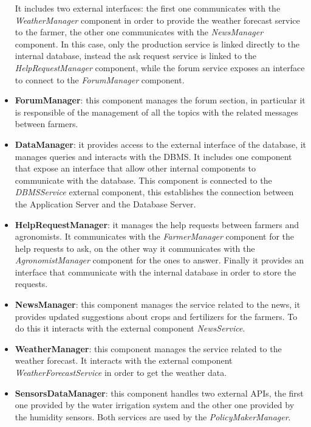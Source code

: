 \documentclass[table, 12pt]{article}
\begin{document}
\begin{itemize}
    It includes two external interfaces: the first one communicates with the \textit{WeatherManager} component in order to provide the weather forecast service to the farmer, the other one communicates with the \textit{NewsManager} component.
    In this case, only the production service is linked directly to the internal database, instead the ask request service is linked to the \textit{HelpRequestManager} component, while the forum service exposes an interface to connect to the \textit{ForumManager} component.
    \item \textbf{ForumManager}: this component manages the forum section, in particular it is responsible of the management of all the topics with the related messages between farmers.
    \item \textbf{DataManager}: it provides access to the external interface of the database, it manages queries and interacts with the DBMS.
    It includes one component that expose an interface that allow other internal components to communicate with the database.
    This component is connected to the \textit{DBMSService} external component, this establishes the connection between the Application Server and the Database Server.
    \item \textbf{HelpRequestManager}: it manages the help requests between farmers and agronomists.
    It communicates with the \textit{FarmerManager} component for the help requests to ask, on the other way it communicates with the \textit{AgronomistManager} component for the ones to answer.
    Finally it provides an interface that communicate with the internal database in order to store the requests.
    \item \textbf{NewsManager}: this component manages the service related to the news, it provides updated suggestions about crops and fertilizers for the farmers.
    To do this it interacts with the external component \textit{NewsService}.
    \item \textbf{WeatherManager}: this component manages the service related to the weather forecast.
    It interacts with the external component \textit{WeatherForecastService} in order to get the weather data.
    \item \textbf{SensorsDataManager}: this component handles two external APIs, the first one provided by the water irrigation system and the other one provided by the humidity sensors.
    Both services are used by the \textit{PolicyMakerManager}.
\end{itemize}

\newpage
\end{document}
